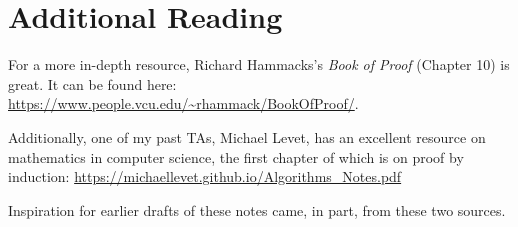 \documentclass{article}
\theoremstyle{plain}
\theoremstyle{definition}
\begin{document}





\section{Additional Reading}

For a more in-depth resource, Richard Hammacks's \emph{Book of Proof} (Chapter 10) is great. It can be found here: \url{https://www.people.vcu.edu/~rhammack/BookOfProof/}.

Additionally, one of my past TAs, Michael Levet, has an excellent resource on mathematics in computer science, the first chapter of which is on proof by induction: \url{https://michaellevet.github.io/Algorithms_Notes.pdf}

Inspiration for earlier drafts of these notes came, in part, from these two sources.
\end{document}
